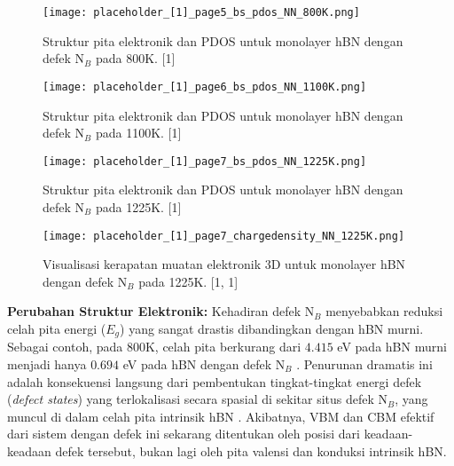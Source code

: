 \begin{figure}[h!]
    \centering
    \texttt{[image: placeholder\_[1]\_page5\_bs\_pdos\_NN\_800K.png]}
    \caption{Struktur pita elektronik dan PDOS untuk monolayer hBN dengan defek N$_B$ pada 800K. [1]}
    \label{fig:hbn_NN_800K}
\end{figure}
\begin{figure}[h!]
    \centering
    \texttt{[image: placeholder\_[1]\_page6\_bs\_pdos\_NN\_1100K.png]}
    \caption{Struktur pita elektronik dan PDOS untuk monolayer hBN dengan defek N$_B$ pada 1100K. [1]}
    \label{fig:hbn_NN_1100K}
\end{figure}
\begin{figure}[h!]
    \centering
    \texttt{[image: placeholder\_[1]\_page7\_bs\_pdos\_NN\_1225K.png]}
    \caption{Struktur pita elektronik dan PDOS untuk monolayer hBN dengan defek N$_B$ pada 1225K. [1]}
    \label{fig:hbn_NN_1225K}
\end{figure}
\begin{figure}[h!]
    \centering
    \texttt{[image: placeholder\_[1]\_page7\_chargedensity\_NN\_1225K.png]}
    \caption{Visualisasi kerapatan muatan elektronik 3D untuk monolayer hBN dengan defek N$_B$ pada 1225K. [1, 1]}
    \label{fig:hbn_NN_1225K_chargedensity}
\end{figure}

\textbf{Perubahan Struktur Elektronik:}
Kehadiran defek N$_B$ menyebabkan reduksi celah pita energi ($E_g$) yang sangat drastis dibandingkan dengan hBN murni. Sebagai contoh, pada 800K, celah pita berkurang dari $4.415$ eV pada hBN murni menjadi hanya $0.694$ eV pada hBN dengan defek N$_B$ \cite{[1, 1]}. Penurunan dramatis ini adalah konsekuensi langsung dari pembentukan tingkat-tingkat energi defek (\textit{defect states}) yang terlokalisasi secara spasial di sekitar situs defek N$_B$, yang muncul di dalam celah pita intrinsik hBN \cite{[1, 1]}. Akibatnya, VBM dan CBM efektif dari sistem dengan defek ini sekarang ditentukan oleh posisi dari keadaan-keadaan defek tersebut, bukan lagi oleh pita valensi dan konduksi intrinsik hBN.

